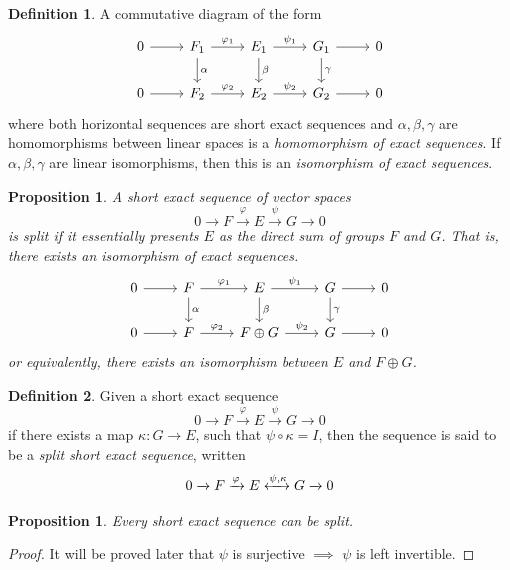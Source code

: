 \documentclass{article}
\newtheorem{proposition}[theorem]{Proposition}
\theoremstyle{remark}
\theoremstyle{definition}
\newtheorem{definition}{Definition}[section]
\begin{document}
    \begin{definition}
    A commutative diagram of the form
    \[\begin{tikzcd}
        0 \arrow{r} & F_1 \arrow{d}{\alpha} \arrow{r}{\varphi_1} & E_1 \arrow{d}{\beta} \arrow{r}{\psi_1} & G_1 \arrow{d}{\gamma} \arrow{r} & 0 \\
        0 \arrow{r} & F_2 \arrow{r}{\varphi_2} & E_2 \arrow{r}{\psi_2} & G_2 \arrow{r} & 0 
    \end{tikzcd}\]
    where both horizontal sequences are short exact sequences and $\alpha, \beta, \gamma$ are homomorphisms between linear spaces is a \textit{homomorphism of exact sequences}. If $\alpha, \beta, \gamma$ are linear isomorphisms, then this is an \textit{isomorphism of exact sequences}. 
    \end{definition}

    \begin{proposition}
    A short exact sequence of vector spaces
    \[0 \xrightarrow{} F \xrightarrow{\varphi} E \xrightarrow{\psi} G \xrightarrow{} 0\]
    is split if it essentially presents $E$ as the direct sum of groups $F$ and $G$. That is, there exists an isomorphism of exact sequences.
    \[\begin{tikzcd}
        0 \arrow{r} & F \arrow{d}{\alpha} \arrow{r}{\varphi_1} & E \arrow{d}{\beta} \arrow{r}{\psi_1} & G \arrow{d}{\gamma} \arrow{r} & 0 \\
        0 \arrow{r} & F \arrow{r}{\varphi_2} & F \oplus G \arrow{r}{\psi_2} & G \arrow{r} & 0 
    \end{tikzcd}\]
    or equivalently, there exists an isomorphism between $E$ and $F \oplus G$. 
    \end{proposition}

    \begin{definition}
    Given a short exact sequence
    \[0 \xrightarrow{} F \xrightarrow{\varphi} E \xrightarrow{\psi} G \xrightarrow{} 0\]
    if there exists a map $\kappa: G \longrightarrow E$, such that $ \psi \circ \kappa = I$, then the sequence is said to be a \textit{split short exact sequence}, written
    \[0 \xrightarrow{} F \xrightarrow{\varphi} E \xleftrightarrow{\psi, \kappa} G \xrightarrow{} 0\]
    \end{definition}

    \begin{proposition}
    Every short exact sequence can be split. 
    \end{proposition}
    \begin{proof}
    It will be proved later that $\psi$ is surjective $\implies$ $\psi$ is left invertible. 
    \end{proof}
\end{document}
